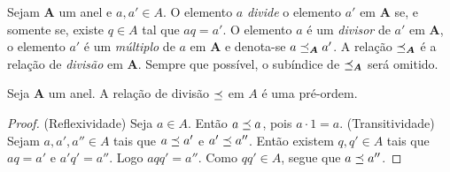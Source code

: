 
\begin{definition}
Sejam $\bm A$ um anel e $a,a' \in A$. O elemento $a$ \emph{divide} o elemento $a'$ em $\bm A$ se, e somente se, existe $q \in A$ tal que $aq=a'$. O elemento $a$ é um \emph{divisor} de $a'$ em $\bm A$, o elemento $a'$ é um \emph{múltiplo} de $a$ em $\bm A$ e denota-se $a \preceq_{\bm A} a'$. A relação $\preceq_{\bm A}$ é a relação de \emph{divisão} em $\bm A$. Sempre que possível, o subíndice de $\preceq_{\bm A}$ será omitido.
\end{definition}

\begin{proposition}
Seja $\bm A$ um anel. A relação de divisão $\preceq$ em $A$ é uma pré-ordem.
\end{proposition}
\begin{proof}
(Reflexividade) Seja $a \in A$. Então $a \preceq a$, pois $a \cdot 1 = a$. (Transitividade) Sejam $a,a',a'' \in A$ tais que $a \preceq a'$ e $a' \preceq a''$. Então existem $q,q' \in A$ tais que $aq=a'$ e $a'q'=a''$. Logo $aqq'=a''$. Como $qq' \in A$, segue que $a \preceq a''$.
\end{proof}

